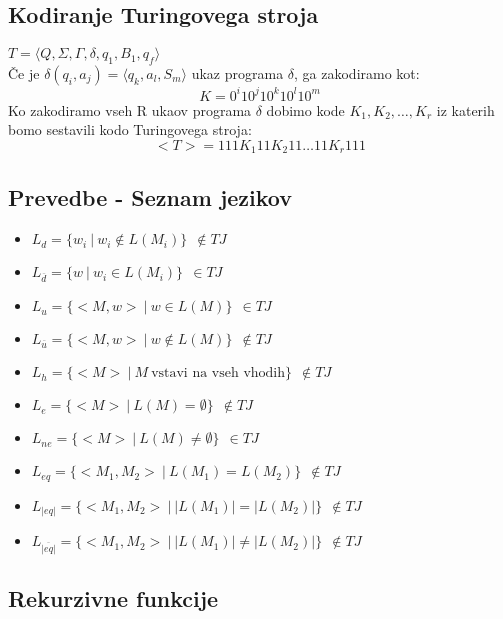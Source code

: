 \documentclass[a4paper]{article}
\begin{document}
\begin{multicols}{2}

\subsection*{Kodiranje Turingovega stroja}
$T=\langle Q,\Sigma,\Gamma,\delta,q_1,B_1,q_f \rangle$ \\
Če je $\delta(q_i,a_j)=\langle q_k, a_l, S_m \rangle$ ukaz programa $\delta$, ga zakodiramo kot:
	\[ K=0^i 1 0^j 1 0^k 1 0^l 1 0^m\]
Ko zakodiramo vseh R ukaov programa $\delta$ dobimo kode $K_1, K_2, \dots, K_r$ iz katerih bomo sestavili kodo Turingovega stroja:
	\[ <T> = 111 K_1 11 K_2 11 \dots 11 K_r 111\]%

\subsection*{Prevedbe - Seznam jezikov}
\begin{itemize}

\item $L_d = \lbrace w_i \ | \ w_i \not\in L(M_i) \rbrace \ \ \not\in TJ $ 
\item $L_{\overline{d}} = \lbrace w \ | \ w_i \in L(M_i) \rbrace \ \ \in TJ $ 
\item $L_u = \lbrace <M,w> \ | \ w \in L(M) \rbrace \ \ \in TJ $ 
\item $L_{\overline{u}} = \lbrace <M,w> \ | \ w \not\in L(M) \rbrace \ \ \not\in TJ $ 
\item $L_h = \lbrace <M> \ | \ M \ \text{vstavi na vseh vhodih} \rbrace \ \ \not\in TJ $ 
\item $L_e = \lbrace <M> \ | \ L(M) = \emptyset \rbrace \ \ \not\in TJ $ 
\item $L_{ne} = \lbrace <M> \ | \ L(M) \neq \emptyset \rbrace \ \ \in TJ $ 
\item $L_{eq} = \lbrace <M_1,M_2> \ | \ L(M_1) = L(M_2) \rbrace \ \ \not\in TJ $ 
\item $L_{|eq|} = \lbrace <M_1,M_2> \ | \ |L(M_1)| = |L(M_2)| \rbrace \ \ \not\in TJ $ 
\item $L_{ \overline{ |eq|}} = \lbrace <M_1,M_2> \ | \ |L(M_1)| \neq |L(M_2)| \rbrace \ \ \not\in TJ $ 

\end{itemize}

\subsection*{Rekurzivne funkcije}
\begin{enumerate}


\end{enumerate}
\end{multicols}
\end{document}
